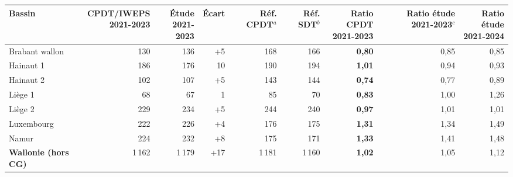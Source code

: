 \begin{tabular}{lrrrrrrrr}
\toprule
Bassin & \makecell{CPDT/IWEPS\\2021-2023} & \makecell{Étude\\2021-2023} & Écart & \makecell{Réf.\\CPDT$^{a}$} & \makecell{Réf.\\SDT$^{b}$} & \makecell{Ratio CPDT\\2021-2023} & \makecell{Ratio étude\\2021-2023$^{c}$} & \makecell{Ratio étude\\2021-2024} \\
\midrule
Brabant wallon & 130 & 136 & +5 & 168 & 166 & \textbf{0{,}80} & 0{,}85 & 0{,}85 \\
Hainaut 1 & 186 & 176 & \textminus{}10 & 190 & 194 & \textbf{1{,}01} & 0{,}94 & 0{,}93 \\
Hainaut 2 & 102 & 107 & +5 & 143 & 144 & \textbf{0{,}74} & 0{,}77 & 0{,}89 \\
Liège 1 & 68 & 67 & \textminus{}1 & 85 & 70 & \textbf{0{,}83} & 1{,}00 & 1{,}26 \\
Liège 2 & 229 & 234 & +5 & 244 & 240 & \textbf{0{,}97} & 1{,}01 & 1{,}01 \\
Luxembourg & 222 & 226 & +4 & 176 & 175 & \textbf{1{,}31} & 1{,}34 & 1{,}49 \\
Namur & 224 & 232 & +8 & 175 & 171 & \textbf{1{,}33} & 1{,}41 & 1{,}48 \\
\midrule
\textbf{Wallonie (hors CG)} & 1\,162 & 1\,179 & +17 & 1\,181 & 1\,160 & \textbf{1{,}02} & 1{,}05 & 1{,}12 \\
\bottomrule
\end{tabular}
